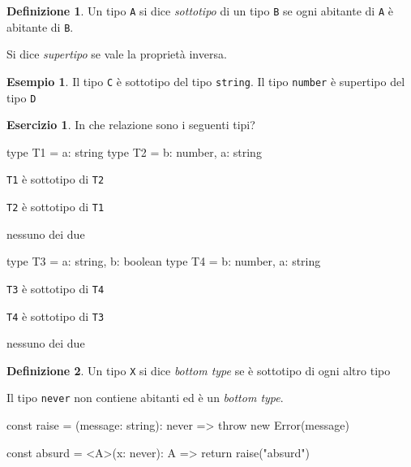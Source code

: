 \documentclass[12pt]{article}
\theoremstyle{definition}
\newtheorem{definition}{Definizione}[section]
\newtheorem{example}{Esempio}[subsection]
\newtheorem{exercise}{Esercizio}[subsection]
\newenvironment{code}
  {\vspace{0.5cm} \VerbatimEnvironment\begin{typescriptcode}}
  {\end{typescriptcode} \vspace{0.2cm}}
\begin{document}
\begin{definition}
Un tipo \texttt{A} si dice \emph{sottotipo} di un tipo \texttt{B} se ogni abitante di \texttt{A} è abitante di \texttt{B}.

Si dice \emph{supertipo} se vale la proprietà inversa.
\end{definition}

\begin{example}
Il tipo \texttt{C} è sottotipo del tipo \texttt{string}.
Il tipo \texttt{number} è supertipo del tipo \texttt{D}
\end{example}

\begin{exercise}
In che relazione sono i seguenti tipi?

\begin{code}
type T1 = { a: string }
type T2 = { b: number, a: string }
\end{code}

\begin{todolist}
\item \texttt{T1} è sottotipo di \texttt{T2}
\item \texttt{T2} è sottotipo di \texttt{T1}
\item nessuno dei due
\end{todolist}

\begin{code}
type T3 = { a: string, b: boolean }
type T4 = { b: number, a: string }
\end{code}

\begin{todolist}
\item \texttt{T3} è sottotipo di \texttt{T4}
\item \texttt{T4} è sottotipo di \texttt{T3}
\item nessuno dei due
\end{todolist}
\end{exercise}

\begin{definition}
Un tipo \texttt{X} si dice \emph{bottom type} se è sottotipo di ogni altro tipo
\end{definition}

Il tipo \texttt{never} non contiene abitanti ed è un \emph{bottom type}.

\begin{code}
const raise = (message: string): never => {
  throw new Error(message)
}

const absurd = <A>(x: never): A => {
  return raise("absurd")
}
\end{code}
\end{document}
